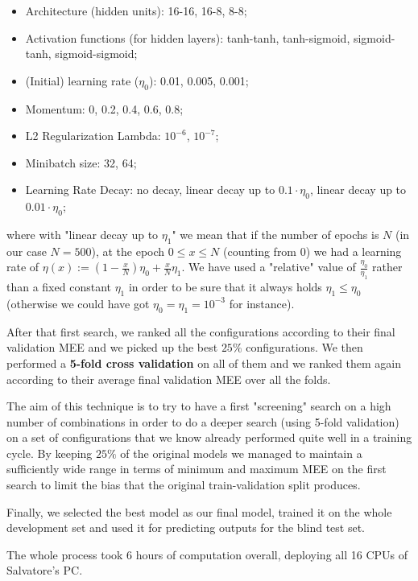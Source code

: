 \begin{itemize}
    \item Architecture (hidden units): 16-16, 16-8, 8-8;
    \item Activation functions (for hidden layers): tanh-tanh, tanh-sigmoid, sigmoid-tanh, sigmoid-sigmoid;
    \item (Initial) learning rate ($\eta_0$): 0.01, 0.005, 0.001;
    \item Momentum: 0, 0.2, 0.4, 0.6, 0.8;
    \item L2 Regularization Lambda: $10^{-6}$, $10^{-7}$;
    \item Minibatch size: 32, 64;
    \item Learning Rate Decay: no decay, linear decay up to $0.1 \cdot \eta_0$, linear decay up to $0.01 \cdot \eta_0$;
\end{itemize}

where with "linear decay up to $\eta_1$" we mean that if the number of epochs is $N$ (in our case $N = 500$), at the epoch $0 \leq x \le N$ (counting from $0$) we had a learning rate of $\eta(x) := \left(1 - \frac{x}{N}\right)\eta_0 + \frac{x}{N} \eta_1$. We have used a "relative" value of $\frac{\eta_0}{\eta_1}$ rather than a fixed constant $\eta_1$ in order to be sure that it always holds $\eta_1 \leq \eta_0$ (otherwise we could have got $\eta_0 = \eta_1 = 10^{-3}$ for instance).

After that first search, we ranked all the configurations according to their final validation MEE and we picked up the best $25\%$ configurations. We then performed a \textbf{5-fold cross validation} on all of them and we ranked them again according to their average final validation MEE over all the folds. 
 
The aim of this technique is to try to have a first "screening" search on a high number of combinations in order to do a deeper search (using 5-fold validation) on a set of configurations that we know already performed quite well in a training cycle. By keeping $25\%$ of the original models we managed to maintain a sufficiently wide range in terms of minimum and maximum MEE on the first search to limit the bias that the original train-validation split produces.

Finally, we selected the best model as our final model, trained it on the whole development set and used it for predicting outputs for the blind test set.

The whole process took 6 hours of computation overall, deploying all 16 CPUs of Salvatore's PC.


